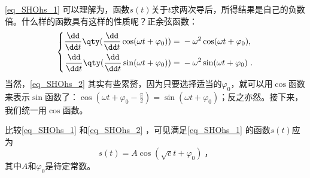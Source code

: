 \autoref{eq_SHOhs_1} 可以理解为，函数$s(t)$关于$t$求两次导后，所得结果是自己的负数倍。什么样的函数具有这样的性质呢？正余弦函数：
\begin{equation}\label{eq_SHOhs_2}
\left\{
\begin{aligned}
    \frac{\dd}{\dd t}\qty(\frac{\dd}{\dd t}\cos(\omega t+\varphi_0)) ={}& -\omega^2\cos(\omega t+\varphi_0), \\
    \frac{\dd}{\dd t}\qty(\frac{\dd}{\dd t}\sin(\omega t+\varphi_0)) ={}& -\omega^2\sin(\omega t+\varphi_0)~. 
\end{aligned}
\right. 
\end{equation}
当然，\autoref{eq_SHOhs_2} 其实有些累赘，因为只要选择适当的$\varphi_0$，就可以用$\cos$函数来表示$\sin$函数了：$\cos(\omega t+\varphi_0-\frac{\pi}{2})=\sin(\omega t+\varphi_0)$；反之亦然。接下来，我们统一用$\cos$函数。

比较\autoref{eq_SHOhs_1} 和\autoref{eq_SHOhs_2} ，可见满足\autoref{eq_SHOhs_1} 的函数$s(t)$应为
\begin{equation}
s(t) = A\cos(\sqrt{c}t+\varphi_0)~， 
\end{equation}
其中$A$和$\varphi_0$是待定常数。


























